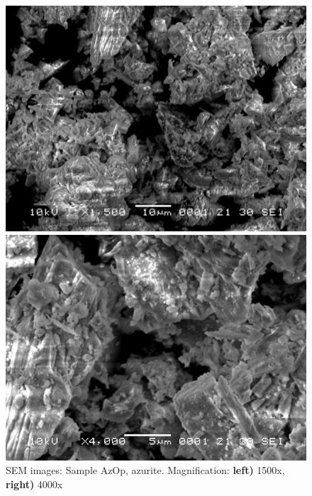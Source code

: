 \begin{figure}[H]
\centering
\begin{minipage}{.45\textwidth}
  \centering
  \includegraphics[width=\linewidth]{AzOp_x1500_2_150321}
\end{minipage}
\begin{minipage}{.45\textwidth}
  \centering
  \includegraphics[width=\linewidth]{AzOp_x4000_1_150321}
\end{minipage}
\caption[SEM images: Sample AzOp, azurite]{SEM images: Sample AzOp, azurite. Magnification: \textbf{left)} 1500x, \textbf{right)} 4000x}
\label{fig:azop_sem_2}
\end{figure}

